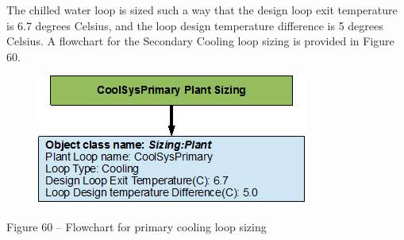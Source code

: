 The chilled water loop is sized such a way that the design loop exit temperature is 6.7 degrees Celsius, and the loop design temperature difference is 5 degrees Celsius. A flowchart for the Secondary Cooling loop sizing is provided in Figure 60.

\begin{figure}[htbp]
\centering
\includegraphics{media/image060.png}
\caption{}
\end{figure}

Figure 60 -- Flowchart for primary cooling loop sizing
